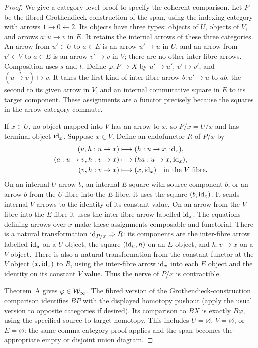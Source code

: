 \begin{proof}
We give a category-level proof to specify the coherent comparison. Let $P$ be the fibred Grothendieck construction of the span, using the indexing category with arrows $1\to0\leftarrow2$. Its objects have three types: objects of $U$, objects of $V$, and arrows $a:u\to v$ in $E$. It retains the internal arrows of these three categories. An arrow from $u'\in U$ to $a\in E$ is an arrow $u'\to u$ in $U$, and an arrow from $v'\in V$ to $a\in E$ is an arrow $v'\to v$ in $V$; there are no other inter-fibre arrows. Composition uses $s$ and $t$. Define $\varphi:P\to X$ by $u'\mapsto u'$, $v'\mapsto v'$, and $(u\xrightarrow{a}v)\mapsto v$. It takes the first kind of inter-fibre arrow $b:u'\to u$ to $ab$, the second to its given arrow in $V$, and an internal commutative square in $E$ to its target component. These assignments are a functor precisely because the squares in the arrow category commute.

If $x\in U$, no object mapped into $V$ has an arrow to $x$, so $P/x=U/x$ and has terminal object $\mathrm{id}_x$. Suppose $x\in V$. Define an endofunctor $R$ of $P/x$ by
\[
\begin{aligned}
(u,h:u\to x)&\longmapsto(h:u\to x,\mathrm{id}_x),\\
(a:u\to v,h:v\to x)&\longmapsto(ha:u\to x,\mathrm{id}_x),\\
(v,h:v\to x)&\longmapsto(x,\mathrm{id}_x)\quad\text{in the $V$ fibre}.
\end{aligned}
\]
On an internal $U$ arrow $b$, an internal $E$ square with source component $b$, or an arrow $b$ from the $U$ fibre into the $E$ fibre, it uses the square $(b,\mathrm{id}_x)$. It sends internal $V$ arrows to the identity of its constant value. On an arrow from the $V$ fibre into the $E$ fibre it uses the inter-fibre arrow labelled $\mathrm{id}_x$. The equations defining arrows over $x$ make these assignments composable and functorial. There is a natural transformation $\mathrm{id}_{P/x}\Rightarrow R$: its components are the inter-fibre arrow labelled $\mathrm{id}_u$ on a $U$ object, the square $(\mathrm{id}_u,h)$ on an $E$ object, and $h:v\to x$ on a $V$ object. There is also a natural transformation from the constant functor at the $V$ object $(x,\mathrm{id}_x)$ to $R$, using the inter-fibre arrow $\mathrm{id}_x$ into each $E$ object and the identity on its constant $V$ value. Thus the nerve of $P/x$ is contractible.

Theorem~A gives $\varphi\in\mathcal{W}_{\infty}$. The fibred version of the Grothendieck-construction comparison identifies $BP$ with the displayed homotopy pushout (apply the usual version to opposite categories if desired). Its comparison to $BX$ is exactly $B\varphi$, using the specified source-to-target homotopy. This includes $U=\varnothing$, $V=\varnothing$, or $E=\varnothing$: the same comma-category proof applies and the span becomes the appropriate empty or disjoint union diagram.


\end{proof}
